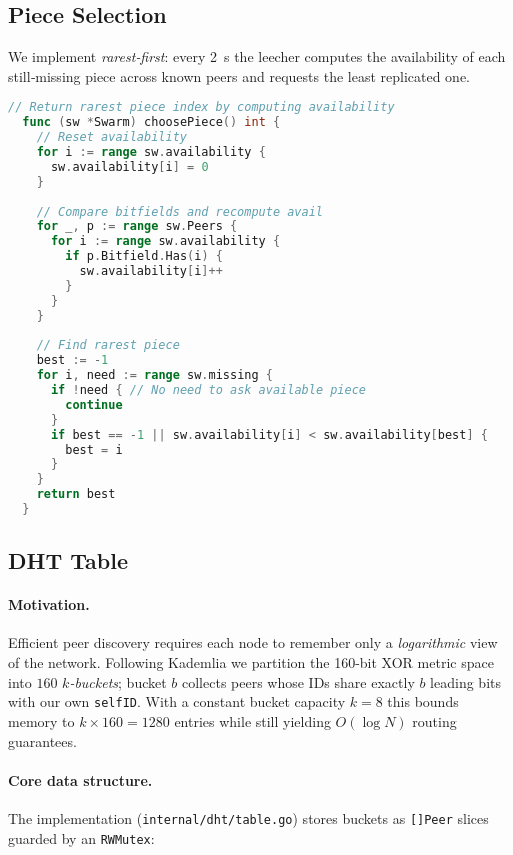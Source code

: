 \documentclass[11pt,a4paper]{article}
\begin{document}
\newpage
\subsection{Piece Selection}
We implement \emph{rarest‑first}: every 2~s the leecher computes the availability of each still‑missing piece across known peers and requests the least replicated one.
\begin{lstlisting}[language=go]
  // Return rarest piece index by computing availability
  func (sw *Swarm) choosePiece() int {
    // Reset availability
    for i := range sw.availability {
      sw.availability[i] = 0
    }
  
    // Compare bitfields and recompute avail
    for _, p := range sw.Peers {
      for i := range sw.availability {
        if p.Bitfield.Has(i) {
          sw.availability[i]++
        }
      }
    }
  
    // Find rarest piece
    best := -1
    for i, need := range sw.missing {
      if !need { // No need to ask available piece
        continue
      }
      if best == -1 || sw.availability[i] < sw.availability[best] {
        best = i
      }
    }
    return best
  }  
\end{lstlisting}

\newpage
\subsection{DHT Table}\label{sec:dhttable}

\paragraph{Motivation.}
Efficient peer discovery requires each node to remember only a \emph{logarithmic}
view of the network.
Following Kademlia \cite{maymounkov2002kademlia} we partition the
160-bit XOR metric space into \(160\) \emph{\(k\)-buckets}; bucket \(b\)
collects peers whose IDs share exactly \(b\) leading bits with our own
\texttt{selfID}.
With a constant bucket capacity \(k{=}8\) this bounds memory to
\(k\!\times\!160 = 1280\) entries while still yielding
\(O(\log N)\) routing guarantees.

\paragraph{Core data structure.}
The implementation (\texttt{internal/dht/table.go}) stores buckets as
\lstinline[style=code]{[]Peer} slices guarded by an \lstinline{RWMutex}:
\end{document}
